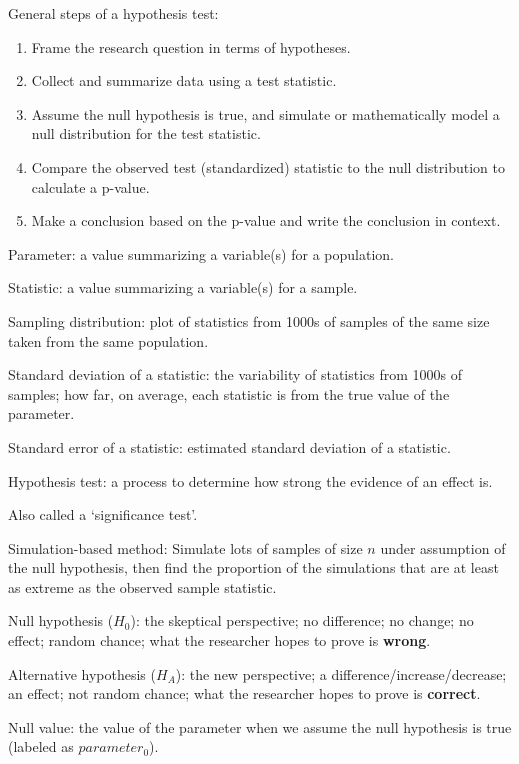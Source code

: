 \documentclass[
]{report}
\newcommand{\rgi}{\hspace{24pt}}  %
\begin{document}
General steps of a hypothesis test:

\begin{enumerate}
\def\labelenumi{\arabic{enumi}.}
\item
  Frame the research question in terms of hypotheses.
\item
  Collect and summarize data using a test statistic.
\item
  Assume the null hypothesis is true, and simulate or mathematically model a null distribution for the test statistic.
\item
  Compare the observed test (standardized) statistic to the null distribution to calculate a p-value.
\item
  Make a conclusion based on the p-value and write the conclusion in context.
\end{enumerate}

Parameter: a value summarizing a variable(s) for a population.

Statistic: a value summarizing a variable(s) for a sample.

Sampling distribution: plot of statistics from 1000s of samples of the same size taken from the same population.

Standard deviation of a statistic: the variability of statistics from 1000s of samples; how far, on average, each statistic is from the true value of the parameter.

Standard error of a statistic: estimated standard deviation of a statistic.

Hypothesis test: a process to determine how strong the evidence of an effect is.

\rgi Also called a `significance test'.

Simulation-based method: Simulate lots of samples of size \(n\) under assumption of the null hypothesis, then find the proportion of the simulations that are at least as extreme as the observed sample statistic.

Null hypothesis (\(H_0\)): the skeptical perspective; no difference; no change; no effect; random chance; what the researcher hopes to prove is \textbf{wrong}.

Alternative hypothesis (\(H_A\)): the new perspective; a difference/increase/decrease; an effect; not random chance; what the researcher hopes to prove is \textbf{correct}.

Null value: the value of the parameter when we assume the null hypothesis is true (labeled as \(parameter_0\)).
\end{document}
